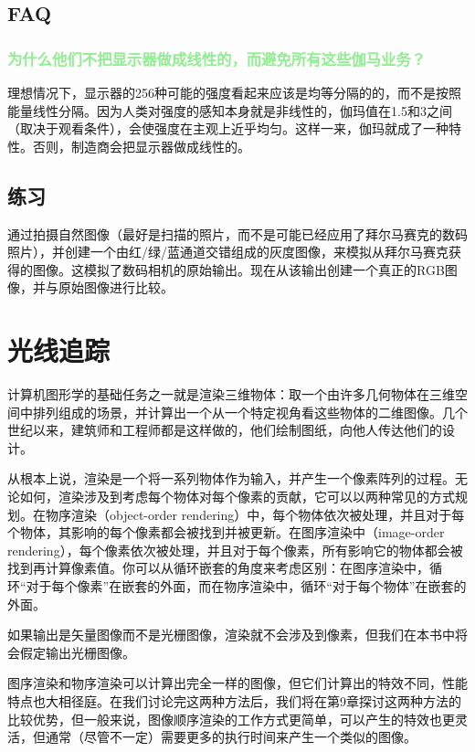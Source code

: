 \documentclass[lang=cn,12pt]{elegantbook}
\begin{document}
\section{FAQ}

\subsection{\textcolor{lightgreen}{为什么他们不把显示器做成线性的，而避免所有这些伽马业务？}}

理想情况下，显示器的256种可能的强度看起来应该是均等分隔的的，而不是按照能量线性分隔。因为人类对强度的感知本身就是非线性的，伽玛值在1.5和3之间（取决于观看条件），会使强度在主观上近乎均匀。这样一来，伽玛就成了一种特性。否则，制造商会把显示器做成线性的。

\section{练习}

通过拍摄自然图像（最好是扫描的照片，而不是可能已经应用了拜尔马赛克的数码照片），并创建一个由红/绿/蓝通道交错组成的灰度图像，来模拟从拜尔马赛克获得的图像。这模拟了数码相机的原始输出。现在从该输出创建一个真正的RGB图像，并与原始图像进行比较。

\chapter{光线追踪}

计算机图形学的基础任务之一就是渲染三维物体：取一个由许多几何物体在三维空间中排列组成的场景，并计算出一个从一个特定视角看这些物体的二维图像。几个世纪以来，建筑师和工程师都是这样做的，他们绘制图纸，向他人传达他们的设计。

从根本上说，渲染是一个将一系列物体作为输入，并产生一个像素阵列的过程。无论如何，渲染涉及到考虑每个物体对每个像素的贡献，它可以以两种常见的方式规划。在物序渲染（object-order rendering）中，每个物体依次被处理，并且对于每个物体，其影响的每个像素都会被找到并被更新。在图序渲染中（image-order rendering），每个像素依次被处理，并且对于每个像素，所有影响它的物体都会被找到再计算像素值。你可以从循环嵌套的角度来考虑区别：在图序渲染中，循环“对于每个像素”在嵌套的外面，而在物序渲染中，循环“对于每个物体”在嵌套的外面。

\begin{note}
如果输出是矢量图像而不是光栅图像，渲染就不会涉及到像素，但我们在本书中将会假定输出光栅图像。 
\end{note}

图序渲染和物序渲染可以计算出完全一样的图像，但它们计算出的特效不同，性能特点也大相径庭。在我们讨论完这两种方法后，我们将在第9章探讨这两种方法的比较优势，但一般来说，图像顺序渲染的工作方式更简单，可以产生的特效也更灵活，但通常（尽管不一定）需要更多的执行时间来产生一个类似的图像。
\end{document}
